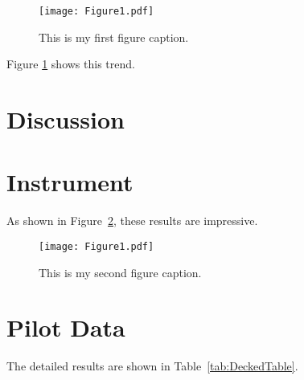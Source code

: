 \documentclass[jou,floatsintext]{apa7}
\begin{document}
\begin{figure}[h]
    \caption{This is my first figure caption.}
    \texttt{[image: Figure1.pdf]}
    \label{fig:Figure1}
\end{figure}

Figure \ref{fig:Figure1} shows this trend. \lipsum[16]

\section{Discussion}
\lipsum[17]

\lipsum[18]

\lipsum[19]

\printbibliography

\appendix

\section{Instrument}
\label{app:instrument}

As shown in Figure~\ref{fig:Figure2}, these results are impressive. \lipsum[20]

\begin{figure}
    \caption{This is my second figure caption.}
    \texttt{[image: Figure1.pdf]}
    \label{fig:Figure2}
\end{figure}

\lipsum[21]
\section{Pilot Data}
\label{app:surveydata}

The detailed results are shown in Table~\ref{tab:DeckedTable}. \lipsum[22]
\end{document}
